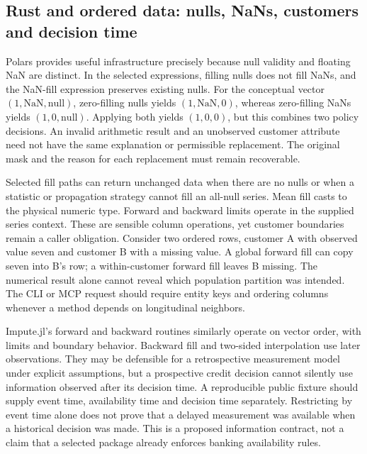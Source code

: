 \subsection{Rust and ordered data: nulls, NaNs, customers and decision time}

Polars provides useful infrastructure precisely because null validity and floating NaN are distinct. In the selected expressions, filling nulls does not fill NaNs, and the NaN-fill expression preserves existing nulls. For the conceptual vector $(1,\mathrm{NaN},\mathrm{null})$, zero-filling nulls yields $(1,\mathrm{NaN},0)$, whereas zero-filling NaNs yields $(1,0,\mathrm{null})$. Applying both yields $(1,0,0)$, but this combines two policy decisions. An invalid arithmetic result and an unobserved customer attribute need not have the same explanation or permissible replacement. The original mask and the reason for each replacement must remain recoverable.~\citep{exec25_otm_polars,exec25_otm_choice}

Selected fill paths can return unchanged data when there are no nulls or when a statistic or propagation strategy cannot fill an all-null series. Mean fill casts to the physical numeric type. Forward and backward limits operate in the supplied series context. These are sensible column operations, yet customer boundaries remain a caller obligation. Consider two ordered rows, customer A with observed value seven and customer B with a missing value. A global forward fill can copy seven into B's row; a within-customer forward fill leaves B missing. The numerical result alone cannot reveal which population partition was intended. The CLI or MCP request should require entity keys and ordering columns whenever a method depends on longitudinal neighbors.~\citep{exec25_otm_polars,exec25_otm_choice}

Impute.jl's forward and backward routines similarly operate on vector order, with limits and boundary behavior. Backward fill and two-sided interpolation use later observations. They may be defensible for a retrospective measurement model under explicit assumptions, but a prospective credit decision cannot silently use information observed after its decision time. A reproducible public fixture should supply event time, availability time and decision time separately. Restricting by event time alone does not prove that a delayed measurement was available when a historical decision was made. This is a proposed information contract, not a claim that a selected package already enforces banking availability rules.~\citep{exec25_otm_imputejl,exec25_otm_choice}


